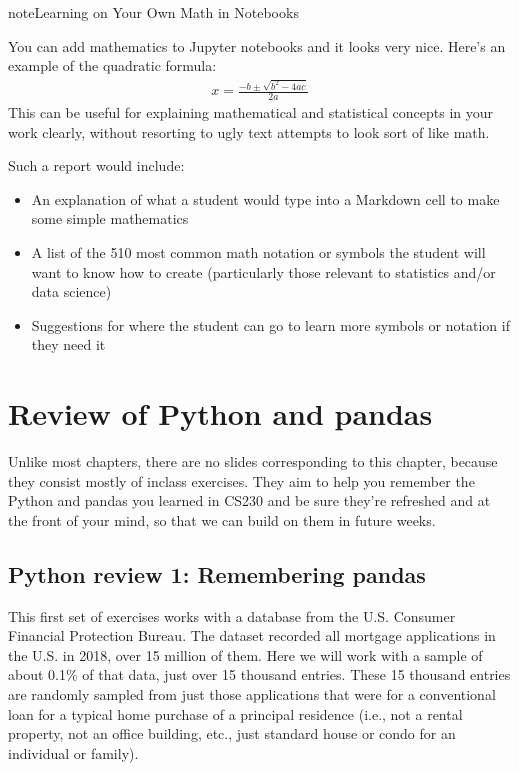 \documentclass[letterpaper,10pt,english]{sphinxmanual}
\begin{document}
\begin{sphinxadmonition}{note}{Learning on Your Own \sphinxhyphen{} Math in Notebooks}

You can add mathematics to Jupyter notebooks and it looks very nice.  Here’s an example of the quadratic formula:
\begin{equation*}
\begin{split}x=\frac{-b\pm\sqrt{b^2-4ac}}{2a}\end{split}
\end{equation*}
This can be useful for explaining mathematical and statistical concepts in your work clearly, without resorting to ugly text attempts to look sort of like math.
\end{sphinxadmonition}

Such a report would include:
\begin{itemize}
\item {} 
An explanation of what a student would type into a Markdown cell to make some simple mathematics

\item {} 
A list of the 5\sphinxhyphen{}10 most common math notation or symbols the student will want to know how to create (particularly those relevant to statistics and/or data science)

\item {} 
Suggestions for where the student can go to learn more symbols or notation if they need it

\end{itemize}


\chapter{Review of Python and pandas}
\label{\detokenize{chapter-4-review-of-python-and-pandas:review-of-python-and-pandas}}\label{\detokenize{chapter-4-review-of-python-and-pandas::doc}}
Unlike most chapters, there are no slides corresponding to this chapter, because they consist mostly of in\sphinxhyphen{}class exercises.  They aim to help you remember the Python and pandas you learned in CS230 and be sure they’re refreshed and at the front of your mind, so that we can build on them in future weeks.


\section{Python review 1: Remembering pandas}
\label{\detokenize{chapter-4-review-of-python-and-pandas:python-review-1-remembering-pandas}}
This first set of exercises works with a database from the U.S. Consumer Financial Protection Bureau.  The dataset recorded all mortgage applications in the U.S. in 2018, over 15 million of them.  Here we will work with a sample of about 0.1\% of that data, just over 15 thousand entries.  These 15 thousand entries are randomly sampled from just those applications that were for a conventional loan for a typical home purchase of a principal residence (i.e., not a rental property, not an office building, etc., just standard house or condo for an individual or family).
\end{document}
